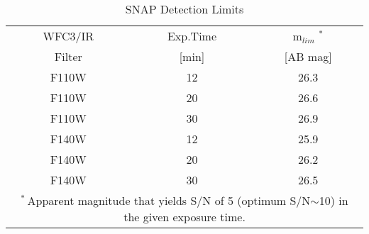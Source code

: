 
\begin{wraptable}{r}{2.25in}
 \caption{SNAP Detection Limits \label{tab:detectionLimits}}
 \begin{tabular}{ccc}
  \toprule
  \toprule
   WFC3/IR & Exp.Time & m$_{lim}$ $^{*}$ \\
   Filter  &  [min] &  [AB mag] \\
   \midrule
   F110W   &    12  &   26.3 \\
   F110W   &    20  &   26.6 \\
   F110W   &    30  &   26.9 \\[2mm]
   F140W   &    12  &   25.9 \\
   F140W   &    20  &   26.2 \\ 
   F140W   &    30  &   26.5 \\
  \bottomrule
 \multicolumn{3}{p{2.6in}}{$^*$\,Apparent magnitude that yields S/N of 5 (optimum S/N$\sim$10) in the given exposure time.}
\end{tabular}
\end{wraptable}



